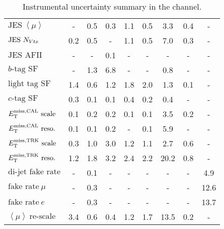 \begin{table}[h!]
\begin{center}
{\begin{tabular}{l || c c | c c c c c c }
$\textrm{JES}~\left \langle \mu \right \rangle$ & - & 0.5 & 0.3 & 1.1
& 0.5 & 3.3 & 0.4 & - \\
$\textrm{JES}~N_{Vtx}$ & 0.2 & 0.5 & - & 1.1 & 0.5 & 7.0 & 0.3 & - \\
$\textrm{JES AFII}$ & - & - & 0.1 & - & - & - & - & - \\
$b\textrm{-tag SF}$ & - & 1.3 & 6.8 & - & - & 0.8 & - & - \\
$\textrm{light tag SF}$ & 1.4 & 0.6 & 1.2 & 1.8 & 2.0 & 1.3 & 0.1 & -
\\
$c\textrm{-tag SF}$ & 0.3 & 0.1 & 0.1 & 0.4 & 0.2 & 0.4 & - & - \\
$E_{\mathrm{T}}^{\rm miss, CAL}~\textrm{scale}$ & 0.1 & 0.2 & 0.2 & 0.1 & 0.1 & 3.5 & 0.2 &
- \\
$E_{\mathrm{T}}^{\rm miss, CAL}~\textrm{reso.}$ & 0.1 & 0.1 & 0.2 & - & 0.1 & 5.9 & - & - \\
$E_{\rm T}^{\rm miss, TRK}~\textrm{scale}$ & 0.3 & 1.0 & 3.0 & 1.2 & 1.1 & 2.7 & 0.6 & -
\\
$E_{\rm T}^{\rm miss, TRK}~\textrm{reso.}$ & 1.2 & 1.8 & 3.2 & 2.4 & 2.2 & 20.2 & 0.8 &
- \\
$\textrm{di-jet fake rate}$ & - & 0.1 & - & - & - & - & - & 4.9 \\
$\textrm{fake rate}~\mu$ & - & 0.3 & - & - & - & - & - & 12.6 \\
$\textrm{fake rate}~e$ & - & 0.3 & - & - & - & - & - & 13.7 \\
$\left \langle \mu \right \rangle~\textrm{re-scale}$ & 3.4 & 0.6 & 0.4
& 1.2 & 1.7 & 13.5 & 0.2 & - \\
\hline
\end{tabular}
}
\caption[Instrumental uncertainty summary in the \eemm
  channel.]{Instrumental uncertainty summary in the \eemm channel.}
\label{chap:analysis:tab:exp_sys_sf}
\end{center}
\end{table}
